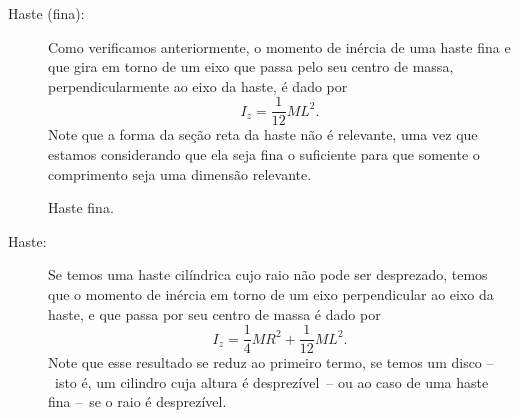 \begin{description}
    \item[Haste (fina):] Como verificamos anteriormente, o momento de inércia de uma haste fina e que gira em torno de um eixo que passa pelo seu centro de massa, perpendicularmente ao eixo da haste, é dado por
        \begin{equation}
            I_z = \frac{1}{12} ML^2.
        \end{equation}
    Note que a forma da seção reta da haste não é relevante, uma vez que estamos considerando que ela seja fina o suficiente para que somente o comprimento seja uma dimensão relevante.
    
\begin{marginfigure}
\centering
{}
\caption{Haste fina.}
\end{marginfigure}

    \item[Haste:] Se temos uma haste cilíndrica cujo raio não pode ser desprezado, temos que o momento de inércia em torno de um eixo perpendicular ao eixo da haste, e que passa por seu centro de massa é dado por
    \begin{equation}
        I_z = \frac{1}{4} MR^2 + \frac{1}{12} ML^2.
    \end{equation}
    Note que esse resultado se reduz ao primeiro termo, se temos um disco --~isto é, um cilindro cuja altura é desprezível~-- ou ao caso de uma haste fina --~se o raio é desprezível. 
  

\end{description}
